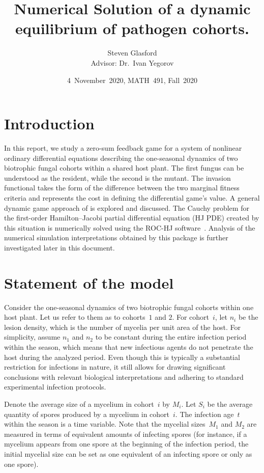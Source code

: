 \documentclass[11pt]{amsart}
\author{Steven Glasford \\ Advisor: Dr.~Ivan Yegorov}
\title{Numerical Solution of a dynamic equilibrium of pathogen cohorts.}
\begin{document}
\date{4~November~2020, MATH~491, Fall~2020}

\maketitle

\section{Introduction}

In this report, we study a zero-sum feedback game for a system of nonlinear
ordinary differential equations describing the one-seasonal dynamics of two
biotrophic fungal cohorts within a shared host plant. The first fungus can be
understood as the resident, while the second is the mutant.  The invasion
functional takes the form of the difference between the two marginal fitness
criteria and represents the cost in defining the differential game's value.
A general dynamic game approach of
\cite{YegorovGrognardMailleretHalkettBernhard2019}
is explored and discussed. The Cauchy problem for the first-order
Hamilton--Jacobi partial differential equation (HJ PDE) created by this
situation is numerically solved using the ROC-HJ software~\cite{ROCHJ2019}.
Analysis of the numerical simulation interpretations obtained by this package
is further investigated later in this document.


\section{Statement of the model}

Consider the one-seasonal dynamics of two biotrophic fungal cohorts within one
host plant. Let us refer to them as to cohorts~$ 1 $ and $ 2 $. For
cohort~$ i $, let $ n_i $ be the lesion density, which is the number of mycelia
per unit area of the host. For simplicity, assume $ n_1 $ and $ n_2 $ to be
constant during the entire infection period within the season, which means that
new infectious agents do not penetrate the host during the analyzed period.
Even though this is typically a substantial restriction for infections in
nature, it still allows for drawing significant conclusions with relevant
biological interpretations and adhering to standard experimental infection
protocols.

Denote the average size of a mycelium in cohort~$ i $ by $ M_i $. Let $ S_i $
be the average quantity of spores produced by a mycelium in cohort~$ i $. The
infection age~$ t $ within the season is a time variable. Note that the
mycelial sizes~$ M_1 $ and $ M_2 $ are measured in terms of equivalent amounts
of infecting spores (for instance, if a mycelium appears from one spore at the
beginning of the infection period, the initial mycelial size can be set as one
equivalent of an infecting spore or only as one spore).
\end{document}

